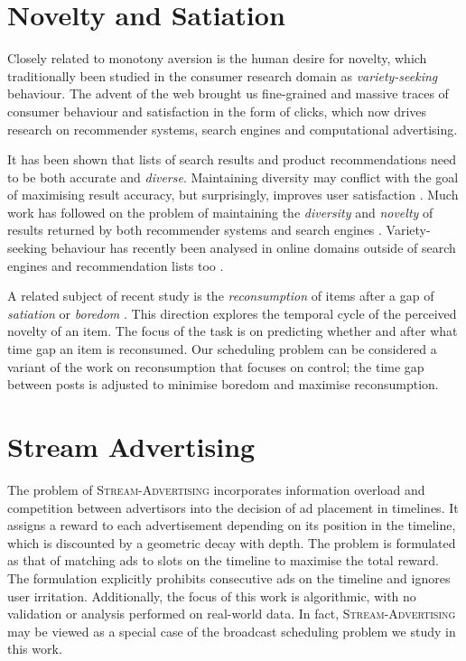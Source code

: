 \documentclass[onecolumn, 12 pt, doublespace, fullpage, letterpaper]{report}
\begin{document}
\section{Novelty and Satiation}

Closely related to monotony aversion is the human desire for novelty, which traditionally been studied in the consumer research domain \cite{Kahn1995139} as \textit{variety-seeking} behaviour. The advent of the web brought us fine-grained and massive traces of consumer behaviour and satisfaction in the form of clicks, which now drives research on recommender systems, search engines and computational advertising.

It has been shown that lists of search results and product recommendations need to be both accurate and \textit{diverse}. Maintaining diversity may conflict with the goal of maximising result accuracy, but surprisingly, improves user satisfaction \cite{McNee:2006:AEA:1125451.1125659}. Much work has followed on the problem of maintaining the \textit{diversity} and \textit{novelty} of results returned by both recommender systems \cite{Ziegler:2005:IRL:1060745.1060754} and search engines \cite{Agrawal:2009:DSR:1498759.1498766}. Variety-seeking behaviour has recently been analysed in online domains outside of search engines and recommendation lists too \cite{Zhang:2014:MNT:2566486.2567976}.

A related subject of recent study is the \textit{reconsumption} of items after a gap of \textit{satiation} or \textit{boredom} \cite{Kapoor:2015:JTR:2684822.2685306,Anderson:2014:DRC:2566486.2568018}. This direction explores the temporal cycle of the perceived novelty of an item. The focus of the task is on predicting whether and after what time gap an item is reconsumed. Our scheduling problem can be considered a variant of the work on reconsumption that focuses on control; the time gap between posts is adjusted to minimise boredom and maximise reconsumption.

\section{Stream Advertising}

The problem of \textsc{Stream-Advertising} \cite{Ieong:2014:AS:2566486.2568030} incorporates information overload and competition between advertisors into the decision of ad placement in timelines. It assigns a reward to each advertisement depending on its position in the timeline, which is discounted by a geometric decay with depth. The problem is formulated as that of matching ads to slots on the timeline to maximise the total reward. The formulation explicitly prohibits consecutive ads on the timeline and ignores user irritation. Additionally, the focus of this work is algorithmic, with no validation or analysis performed on real-world data. In fact, \textsc{Stream-Advertising} may be viewed as a special case of the broadcast scheduling problem we study in this work.
\end{document}
